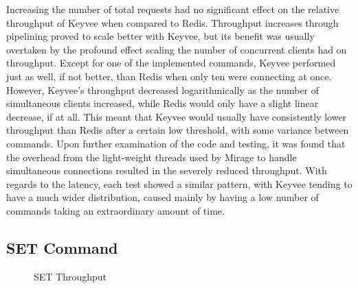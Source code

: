 \documentclass[english,10pt,twocolumn]{article}
\begin{document}
Increasing the number of total requests had no significant effect on the relative throughput of Keyvee when compared to Redis.
Throughput increases through pipelining proved to scale better with Keyvee, but its benefit was usually overtaken by the profound effect scaling the number of concurrent clients had on throughput.
Except for one of the implemented commands, Keyvee performed just as well, if not better, than Redis when only ten were connecting at once.
However, Keyvee's throughput decreased logarithmically as the number of simultaneous clients increased, while Redis would only have a slight linear decrease, if at all.
This meant that Keyvee would usually have consistently lower throughput than Redis after a certain low threshold, with some variance between commands.
Upon further examination of the code and testing, it was found that the overhead from the light-weight threads used by Mirage to handle simultaneous connections resulted in the severely reduced throughput.
With regards to the latency, each test showed a similar pattern, with Keyvee tending to have a much wider distribution, caused mainly by having a low number of commands taking an extraordinary amount of time.

\subsection{SET Command}

\begin{figure}[!htb]
\caption{SET Throughput\label{fig:SET_T}}
\end{figure}
\end{document}
